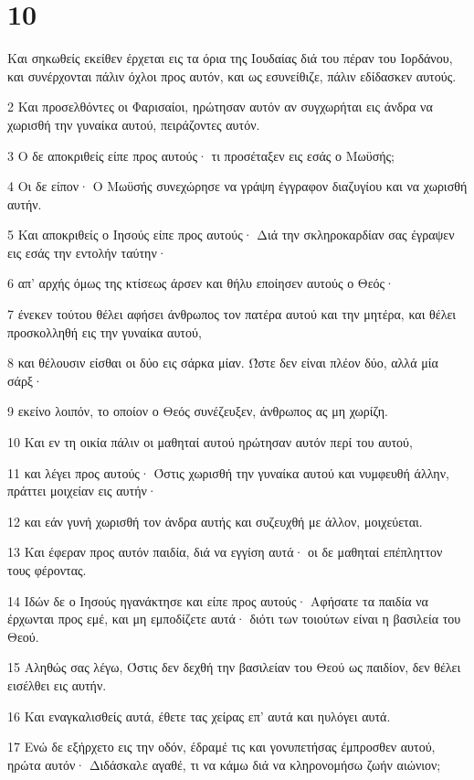 \chapter{10}

\par Και σηκωθείς εκείθεν έρχεται εις τα όρια της Ιουδαίας διά του πέραν του Ιορδάνου, και συνέρχονται πάλιν όχλοι προς αυτόν, και ως εσυνείθιζε, πάλιν εδίδασκεν αυτούς.
\par 2 Και προσελθόντες οι Φαρισαίοι, ηρώτησαν αυτόν αν συγχωρήται εις άνδρα να χωρισθή την γυναίκα αυτού, πειράζοντες αυτόν.
\par 3 Ο δε αποκριθείς είπε προς αυτούς· τι προσέταξεν εις εσάς ο Μωϋσής;
\par 4 Οι δε είπον· Ο Μωϋσής συνεχώρησε να γράψη έγγραφον διαζυγίου και να χωρισθή αυτήν.
\par 5 Και αποκριθείς ο Ιησούς είπε προς αυτούς· Διά την σκληροκαρδίαν σας έγραψεν εις εσάς την εντολήν ταύτην·
\par 6 απ' αρχής όμως της κτίσεως άρσεν και θήλυ εποίησεν αυτούς ο Θεός·
\par 7 ένεκεν τούτου θέλει αφήσει άνθρωπος τον πατέρα αυτού και την μητέρα, και θέλει προσκολληθή εις την γυναίκα αυτού,
\par 8 και θέλουσιν είσθαι οι δύο εις σάρκα μίαν. Ώστε δεν είναι πλέον δύο, αλλά μία σάρξ·
\par 9 εκείνο λοιπόν, το οποίον ο Θεός συνέζευξεν, άνθρωπος ας μη χωρίζη.
\par 10 Και εν τη οικία πάλιν οι μαθηταί αυτού ηρώτησαν αυτόν περί του αυτού,
\par 11 και λέγει προς αυτούς· Όστις χωρισθή την γυναίκα αυτού και νυμφευθή άλλην, πράττει μοιχείαν εις αυτήν·
\par 12 και εάν γυνή χωρισθή τον άνδρα αυτής και συζευχθή με άλλον, μοιχεύεται.
\par 13 Και έφεραν προς αυτόν παιδία, διά να εγγίση αυτά· οι δε μαθηταί επέπληττον τους φέροντας.
\par 14 Ιδών δε ο Ιησούς ηγανάκτησε και είπε προς αυτούς· Αφήσατε τα παιδία να έρχωνται προς εμέ, και μη εμποδίζετε αυτά· διότι των τοιούτων είναι η βασιλεία του Θεού.
\par 15 Αληθώς σας λέγω, Όστις δεν δεχθή την βασιλείαν του Θεού ως παιδίον, δεν θέλει εισέλθει εις αυτήν.
\par 16 Και εναγκαλισθείς αυτά, έθετε τας χείρας επ' αυτά και ηυλόγει αυτά.
\par 17 Ενώ δε εξήρχετο εις την οδόν, έδραμέ τις και γονυπετήσας έμπροσθεν αυτού, ηρώτα αυτόν· Διδάσκαλε αγαθέ, τι να κάμω διά να κληρονομήσω ζωήν αιώνιον;
